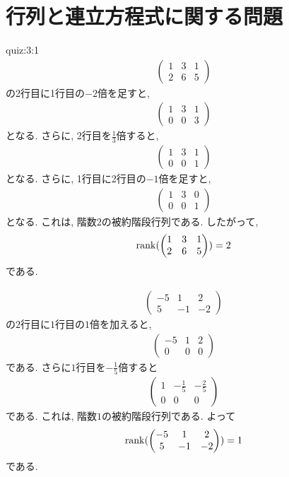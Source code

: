 \section{行列と連立方程式に関する問題}
\begin{answerof}{quiz:3:1}
  \begin{align*}
    \begin{pmatrix}
      1&3&1\\2&6&5
    \end{pmatrix}
  \end{align*}
  の2行目に1行目の$-2$倍を足すと,
  \begin{align*}
    \begin{pmatrix}
      1&3&1\\0&0&3
    \end{pmatrix}
  \end{align*}
  となる. さらに, 2行目を$\frac{1}{3}$倍すると,
  \begin{align*}
    \begin{pmatrix}
      1&3&1\\0&0&1
    \end{pmatrix}
  \end{align*}
  となる. さらに, 1行目に2行目の$-1$倍を足すと,
  \begin{align*}
    \begin{pmatrix}
      1&3&0\\0&0&1
    \end{pmatrix}
  \end{align*}
  となる.  これは, 階数$2$の被約階段行列である.
  したがって, 
  \begin{align*}
    \operatorname{rank}(
    \begin{pmatrix}
      1&3&1\\2&6&5
    \end{pmatrix}
    )=2
  \end{align*}
  である.


  \begin{align*}
    \begin{pmatrix}
      -5&1&2\\5&-1&-2
    \end{pmatrix}
  \end{align*}
  の$2$行目に$1$行目の$1$倍を加えると,
  \begin{align*}
    \begin{pmatrix}
      -5&1&2\\0&0&0
    \end{pmatrix}
  \end{align*}
  である. さらに$1$行目を$-\frac{1}{5}$倍すると
  \begin{align*}
    \begin{pmatrix}
      1&-\frac{1}{5}&-\frac{2}{5}\\0&0&0
    \end{pmatrix}
  \end{align*}
  である.
  これは, 階数$1$の被約階段行列である.
  よって
  \begin{align*}
    \operatorname{rank}(
    \begin{pmatrix}
      -5&1&2\\5&-1&-2
    \end{pmatrix}
    )=1
  \end{align*}
  である.


\end{answerof}
